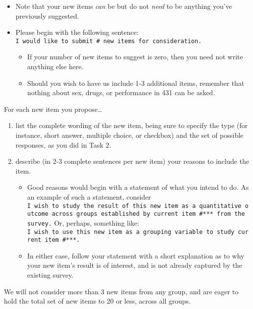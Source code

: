 \documentclass[]{book}
\providecommand{\tightlist}{%
  \setlength{\itemsep}{0pt}\setlength{\parskip}{0pt}}
\begin{document}
\begin{itemize}
\tightlist
\item
  Note that your new items \emph{can} be but do not \emph{need} to be anything you've previously suggested.
\item
  Please begin with the following sentence: \texttt{I\ would\ like\ to\ submit\ \#\ new\ items\ for\ consideration.}

  \begin{itemize}
  \tightlist
  \item
    If your number of new items to suggest is zero, then you need not write anything else here.\\
  \item
    Should you wish to have us include 1-3 additional items, remember that nothing about sex, drugs, or performance in 431 can be asked.
  \end{itemize}
\end{itemize}

For each new item you propose\ldots{}

\begin{enumerate}
\def\labelenumi{\arabic{enumi}.}
\tightlist
\item
  list the complete wording of the new item, being sure to specify the type (for instance, short answer, multiple choice, or checkbox) and the set of possible responses, as you did in Task 2.
\item
  describe (in 2-3 complete sentences per new item) your reasons to include the item.

  \begin{itemize}
  \tightlist
  \item
    Good reasons would begin with a statement of what you intend to do. As an example of such a statement, consider \texttt{I\ wish\ to\ study\ the\ result\ of\ this\ new\ item\ as\ a\ quantitative\ outcome\ across\ groups\ established\ by\ current\ item\ \#***\ from\ the\ survey.} Or, perhaps, something like: \texttt{I\ wish\ to\ use\ this\ new\ item\ as\ a\ grouping\ variable\ to\ study\ current\ item\ \#***.}
  \item
    In either case, follow your statement with a short explanation as to why your new item's result is of interest, and is not already captured by the existing survey.
  \end{itemize}
\end{enumerate}

We will not consider more than 3 new items from any group, and are eager to hold the total set of new items to 20 or less, across all groups.
\end{document}
